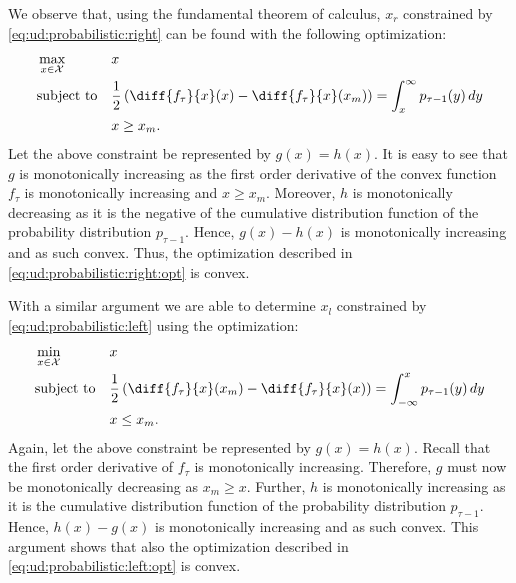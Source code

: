 We observe that, using the fundamental theorem of calculus, $x_r$ constrained by \autoref{eq:ud:probabilistic:right} can be found with the following optimization: \begin{align}\label{eq:ud:probabilistic:right:opt}\begin{aligned}
    &\max_{x \in \mathcal{X}} &&x \\
    &\text{subject to}        &&\frac{1}{2} \left(\diff{f_{\tau}}{x}(x) - \diff{f_{\tau}}{x}(x_m)\right) = \int_{x}^{\infty} p_{\tau-1}(y) \,dy \\
    &                         &&x \geq x_m.
\end{aligned}\end{align} Let the above constraint be represented by $g(x) = h(x)$. It is easy to see that $g$ is monotonically increasing as the first order derivative of the convex function $f_{\tau}$ is monotonically increasing and $x \geq x_m$. Moreover, $h$ is monotonically decreasing as it is the negative of the cumulative distribution function of the probability distribution $p_{\tau-1}$. Hence, $g(x) - h(x)$ is monotonically increasing and as such convex. Thus, the optimization described in \autoref{eq:ud:probabilistic:right:opt} is convex.

With a similar argument we are able to determine $x_l$ constrained by \autoref{eq:ud:probabilistic:left} using the optimization: \begin{align}\label{eq:ud:probabilistic:left:opt}\begin{aligned}
    &\min_{x \in \mathcal{X}} &&x \\
    &\text{subject to}        &&\frac{1}{2} \left(\diff{f_{\tau}}{x}(x_m) - \diff{f_{\tau}}{x}(x)\right) = \int_{-\infty}^{x} p_{\tau-1}(y) \,dy \\
    &                         &&x \leq x_m.
\end{aligned}\end{align} Again, let the above constraint be represented by $g(x) = h(x)$. Recall that the first order derivative of $f_{\tau}$ is monotonically increasing. Therefore, $g$ must now be monotonically decreasing as $x_m \geq x$. Further, $h$ is monotonically increasing as it is the cumulative distribution function of the probability distribution $p_{\tau-1}$. Hence, $h(x) - g(x)$ is monotonically increasing and as such convex. This argument shows that also the optimization described in \autoref{eq:ud:probabilistic:left:opt} is convex.

